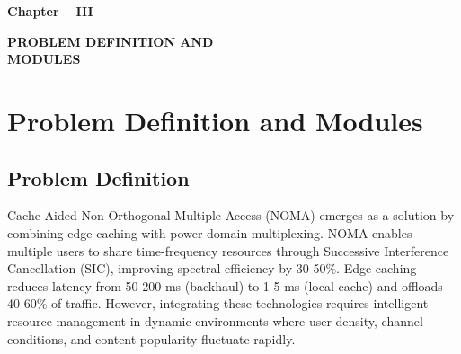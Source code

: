 \documentclass[12pt,a4paper]{article}
\begin{document}
\thispagestyle{plain}


\clearpage

\begin{center}
    \vspace*{10cm}
    
    {\fontsize{16}{19.2}\selectfont\bfseries
    Chapter -- III}
    
    \vspace{1cm}
    
    {\fontsize{16}{19.2}\selectfont\bfseries
    PROBLEM DEFINITION AND\\
    MODULES}
    
    \vspace*{\fill}
\end{center}

\thispagestyle{plain}


\clearpage

\section{Problem Definition and Modules}

\subsection{Problem Definition}

Cache-Aided Non-Orthogonal Multiple Access (NOMA) emerges as a solution by combining edge caching with power-domain multiplexing. NOMA enables multiple users to share time-frequency resources through Successive Interference Cancellation (SIC), improving spectral efficiency by 30-50\%. Edge caching reduces latency from 50-200 ms (backhaul) to 1-5 ms (local cache) and offloads 40-60\% of traffic. However, integrating these technologies requires intelligent resource management in dynamic environments where user density, channel conditions, and content popularity fluctuate rapidly.
\end{document}

